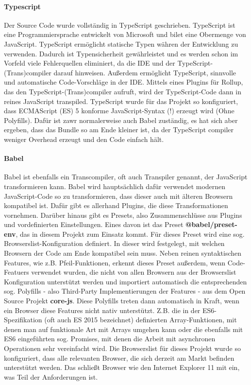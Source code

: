 
\paragraph{Typescript} Der Source Code wurde vollständig in TypeScript geschrieben. TypeScript ist eine Programmiersprache entwickelt von Microsoft und bilet eine Obermenge von JavaScript. TypeScript ermöglicht statische Typen währen der Entwicklung zu verwenden. Dadurch ist Typensicherheit gewährleistet und es werden schon im Vorfeld viele Fehlerquellen eliminiert, da die IDE und der TypeScript-(Trans)compiler darauf hinweisen. Außerdem ermöglicht TypeScript, sinnvolle und automatische Code-Vorschläge in der IDE. 
Mittels eines Plugins für Rollup, das den TypeScript-(Trans)compiler aufruft, wird der TypeScript-Code dann in reines JavaScript transpiled. TypeScript wurde für das Projekt so konfiguriert, dass ECMAScript (ES) 5 konforme JavaScript-Syntax (!) erzeugt wird (Ohne Polyfills). Dafür ist zawr normalerweise auch Babel zuständig, es hat sich aber ergeben, dass das Bundle so am Ende kleiner ist, da der TypeScript compiler weniger Overhead erzeugt und den Code einfach hält.

\paragraph{Babel} Babel ist ebenfalls ein Transcompiler, oft auch Transpiler genannt, der JavaScript transformieren kann. Babel wird hauptsächlich dafür verwendet modernen JavaScript-Code so zu transformieren, dass dieser auch mit älteren Browsern kompatibel ist. Dafür gibt es allerhand Plugins, die diese Transformationen vornehmen. Darüber hinaus gibt es Presets, also Zusammenschlüsse aus Plugins und vordefinierten Einstellungen. Eines davon ist das Preset \textbf{@babel/preset-env}, das in diesem Projekt zum Einsatz kommt. Für dieses Preset wird eine sog. Browserslist-Konfiguration definiert. In dieser wird festgelegt, mit welchen Browsern der Code am Ende kompatibel sein muss. Neben reinen syntaktischen Features, wie z.B. Pfeil-Funktionen, erkennt dieses Preset außerdem, wenn Code-Featuers verwendet wurden, die nicht von allen Browsern aus der Browserslist Konfiguration unterstützt werden und importiert automatisch die entsprechenden sog. Polyfills - also Third-Party Implementierungen der Features - aus dem Open Source Projekt \textbf{core-js}. Diese Polyfills treten dann automatisch in Kraft, wenn ein Browser diese Features nicht nativ unterstützt. Z.B. die in der ES6-Spezifikation (oft auch ES 2015 bezeichnet) definierten Array-Funktionen, mit denen man auf funktionale Art mit Arrays umgehen kann oder die ebenfalls mit ES6 eingeführten sog. Promises, mit denen die Arbeit mit asynchronen Operationen sehr vereinfacht wird. Die Browserslist für dieses Projekt wurde so konfiguriert, dass alle relevanten Browser, die sich derzeit am Markt befinden unterstützt werden. Das schließt Browser wie den Internet Explorer 11  mit ein, was Teil der Anforderungen ist. 


